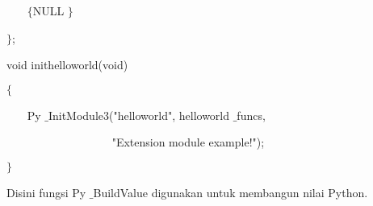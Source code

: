 \documentclass{wileySix}
\begin{document}
\begin{myEnumerate}
\begin{myEnumerate}
{\begin{myEnumerate}
\noindent 
~~~  $  \{  $NULL $  \}  $ \par
\noindent 
$  \}  $; \par
\vspace{12pt}
\noindent 
void inithelloworld(void) \par
\noindent 
$  \{  $ \par
\noindent 
~~~ Py $  \_  $InitModule3("helloworld", helloworld $  \_  $funcs, \par
\noindent 
~~~~~~~~~~~~~~~~~~ "Extension module example!"); \par
\noindent 
$  \}  $ \par
\vspace{12pt}
\vspace{12pt}
\noindent 
\hspace*{0.5in} Disini fungsi Py $  \_  $BuildValue digunakan untuk membangun nilai Python.  \par
\vspace{12pt}
\vspace{12pt}
\noindent 


\end{myEnumerate}}
\end{myEnumerate}
\end{myEnumerate}
\end{document}
